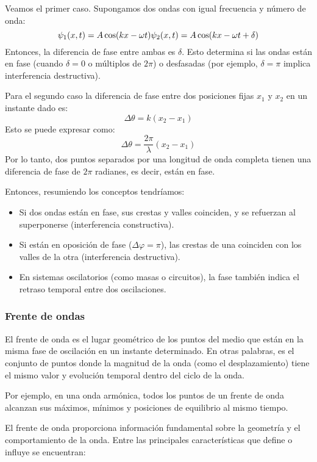 Veamos el primer caso. Supongamos dos ondas con igual frecuencia y número de onda:
\[
\psi_1(x,t) = A \cos(kx - \omega t) \\
\psi_2(x,t) = A \cos(kx - \omega t + \delta)
\]
Entonces, la diferencia de fase entre ambas es \(\delta\). Esto determina si las ondas están en fase (cuando \(\delta = 0\) o múltiplos de \(2\pi\)) o desfasadas (por ejemplo, \(\delta = \pi\) implica interferencia destructiva).

Para el segundo caso la diferencia de fase entre dos posiciones fijas \(x_1\) y \(x_2\) en un instante dado es:
\[
\Delta \theta = k(x_2 - x_1)
\]
Esto se puede expresar como:
\[
\Delta \theta = \frac{2\pi}{\lambda} (x_2 - x_1)
\]
Por lo tanto, dos puntos separados por una longitud de onda completa tienen una diferencia de fase de \(2\pi\) radianes, es decir, están en fase.

Entonces, resumiendo los conceptos tendríamos:
\begin{itemize}
  \item Si dos ondas están en fase, sus crestas y valles coinciden, y se refuerzan al superponerse (interferencia constructiva).
  \item Si están en oposición de fase ($\Delta \varphi = \pi$), las crestas de una coinciden con los valles de la otra (interferencia destructiva).
  \item En sistemas oscilatorios (como masas o circuitos), la fase también indica el retraso temporal entre dos oscilaciones.
\end{itemize}

\subsubsection{Frente de ondas}

El frente de onda es el lugar geométrico de los puntos del medio que están en la misma fase de oscilación en un instante determinado. En otras palabras, es el conjunto de puntos donde la magnitud de la onda (como el desplazamiento) tiene el mismo valor y evolución temporal dentro del ciclo de la onda.

Por ejemplo, en una onda armónica, todos los puntos de un frente de onda alcanzan sus máximos, mínimos y posiciones de equilibrio al mismo tiempo.

El frente de onda proporciona información fundamental sobre la geometría y el comportamiento de la onda. Entre las principales características que define o influye se encuentran:

